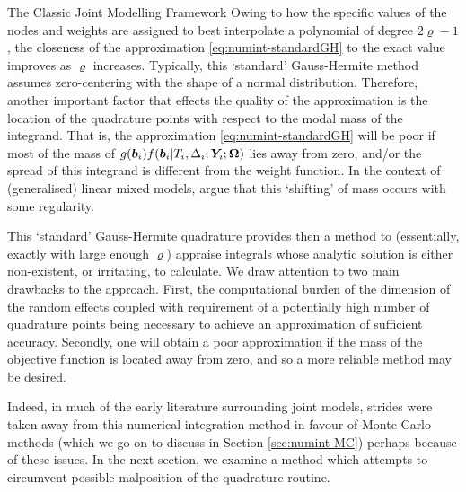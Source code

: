 \begin{chapter}{\label{cha:methods-classic}The Classic Joint Modelling Framework}
Owing to how the specific values of the nodes and weights are assigned to best interpolate a polynomial of degree $2\varrho-1$, the closeness of the approximation \eqref{eq:numint-standardGH} to the exact value improves as $\varrho$ increases. Typically, this `standard' Gauss-Hermite method assumes zero-centering with the shape of a normal distribution. Therefore, another important factor that effects the quality of the approximation is the location of the quadrature points with respect to the modal mass of the integrand. That is, the approximation \eqref{eq:numint-standardGH} will be poor if most of the mass of $g\!\left(\bm{b}_i\right)\!f\!\left(\bm{b}_i|T_i,\Delta_i,\bm{Y}_i;\bm{\mathrm{\Omega}}\right)$ lies away from zero, and/or the spread of this integrand is different from the weight function. In the context of (generalised) linear mixed models, \citet{Stringer2022} argue that this `shifting' of mass occurs with some regularity.

This `standard' Gauss-Hermite quadrature provides then a method to (essentially, exactly with large enough $\varrho$) appraise integrals whose analytic solution is either non-existent, or irritating, to calculate. We draw attention to two main drawbacks to the approach. First, the computational burden of the dimension of the random effects coupled with requirement of a potentially high number of quadrature points being necessary to achieve an approximation of sufficient accuracy. Secondly, one will obtain a poor approximation if the mass of the objective function is located away from zero, and so a more reliable method may be desired. 

Indeed, in much of the early literature surrounding joint models, strides were taken away from this numerical integration method in favour of Monte Carlo methods (which we go on to discuss in Section \ref{sec:numint-MC}) perhaps because of these issues. In the next section, we examine a method which attempts to circumvent possible malposition of the quadrature routine. 


\end{chapter}
